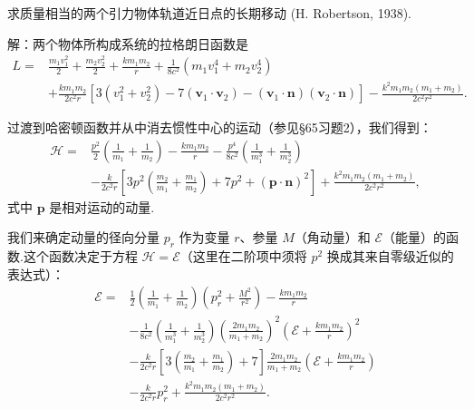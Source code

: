 \begin{xiti}
\quad 求质量相当的两个引力物体轨道近日点的长期移动 (H. Robertson, 1938).

解：两个物体所构成系统的拉格朗日函数是
\begin{equation*}
\begin{aligned}
  L={}&\frac{m_1v_1^{2}}{2}+\frac{m_2v_2^{2}}{2}
  +\frac{km_1m_2}{r}
  +\frac{1}{8c^{2}}(m_1v_1^{4}+m_2v_2^{4})\\
  &+\frac{km_1m_2}{2c^{2}r}
  \left[3(v_1^{2}+v_2^{2})-7(\boldsymbol{v}_1\cdot\boldsymbol{v}_2)
  -(\boldsymbol{v}_1\cdot\boldsymbol{n})(\boldsymbol{v}_2\cdot\boldsymbol{n})\right]
  -\frac{k^{2}m_1m_2(m_1+m_2)}{2c^{2}r^{2}}.
\end{aligned}
\end{equation*}

过渡到哈密顿函数并从中消去惯性中心的运动（参见§65习题2），我们得到：
\begin{equation}
\begin{aligned}
  \mathcal{H}={}&\frac{p^{2}}{2}\left(\frac{1}{m_1}+\frac{1}{m_2}\right)
  -\frac{km_1m_2}{r}
  -\frac{p^{4}}{8c^{2}}\left(\frac{1}{m_1^{3}}+\frac{1}{m_2^{3}}\right)\\
  &-\frac{k}{2c^{2}r}\left[3p^{2}\left(\frac{m_2}{m_1}+\frac{m_1}{m_2}\right)
  +7p^{2}+(\boldsymbol{p}\cdot\boldsymbol{n})^{2}\right]
  +\frac{k^{2}m_1m_2(m_1+m_2)}{2c^{2}r^{2}},
\end{aligned}
\tag{1}
\end{equation}
式中 $\boldsymbol{p}$ 是相对运动的动量.

我们来确定动量的径向分量 $p_r$ 作为变量 $r$、参量 $M$（角动量）和 $\mathcal{E}$（能量）的函数.这个函数决定于方程 $\mathcal{H}=\mathcal{E}$（这里在二阶项中须将 $p^{2}$ 换成其来自零级近似的表达式）：
\begin{equation*}
\begin{aligned}
  \mathcal{E}={}&\frac{1}{2}\left(\frac{1}{m_1}+\frac{1}{m_2}\right)
  \left(p_r^{2}+\frac{M^{2}}{r^{2}}\right)
  -\frac{km_1m_2}{r}\\
  &-\frac{1}{8c^{2}}\left(\frac{1}{m_1^{3}}+\frac{1}{m_2^{3}}\right)
  \left(\frac{2m_1m_2}{m_1+m_2}\right)^{2}
  \left(\mathcal{E}+\frac{km_1m_2}{r}\right)^{2}\\
  &-\frac{k}{2c^{2}r}\left[3\left(\frac{m_2}{m_1}+\frac{m_1}{m_2}\right)+7\right]
  \frac{2m_1m_2}{m_1+m_2}
  \left(\mathcal{E}+\frac{km_1m_2}{r}\right)\\
  &-\frac{k}{2c^{2}r}p_r^{2}
  +\frac{k^{2}m_1m_2(m_1+m_2)}{2c^{2}r^{2}}.
\end{aligned}
\end{equation*}


\end{xiti}
